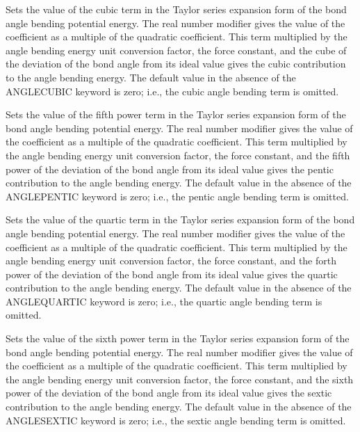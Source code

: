 \documentclass[letterpaper,11pt,english]{sphinxmanual}
\begin{document}
  Sets the value of the cubic term in the Taylor series expansion form of the bond angle bending potential energy. The real number modifier gives the value of the coefficient as a multiple of the quadratic coefficient. This term multiplied by the angle bending energy unit conversion factor, the force constant, and the cube of the deviation of the bond angle from its ideal value gives the cubic contribution to the angle bending energy. The default value in the absence of the ANGLE\sphinxhyphen{}CUBIC keyword is zero; i.e., the cubic angle bending term is omitted.

  Sets the value of the fifth power term in the Taylor series expansion form of the bond angle bending potential energy. The real number modifier gives the value of the coefficient as a multiple of the quadratic coefficient. This term multiplied by the angle bending energy unit conversion factor, the force constant, and the fifth power of the deviation of the bond angle from its ideal value gives the pentic contribution to the angle bending energy. The default value in the absence of the ANGLE\sphinxhyphen{}PENTIC keyword is zero; i.e., the pentic angle bending term is omitted.

  Sets the value of the quartic term in the Taylor series expansion form of the bond angle bending potential energy. The real number modifier gives the value of the coefficient as a multiple of the quadratic coefficient. This term multiplied by the angle bending energy unit conversion factor, the force constant, and the forth power of the deviation of the bond angle from its ideal value gives the quartic contribution to the angle bending energy. The default value in the absence of the ANGLE\sphinxhyphen{}QUARTIC keyword is zero; i.e., the quartic angle bending term is omitted.

  Sets the value of the sixth power term in the Taylor series expansion form of the bond angle bending potential energy. The real number modifier gives the value of the coefficient as a multiple of the quadratic coefficient. This term multiplied by the angle bending energy unit conversion factor, the force constant, and the sixth power of the deviation of the bond angle from its ideal value gives the sextic contribution to the angle bending energy. The default value in the absence of the ANGLE\sphinxhyphen{}SEXTIC keyword is zero; i.e., the sextic angle bending term is omitted.
\end{document}

